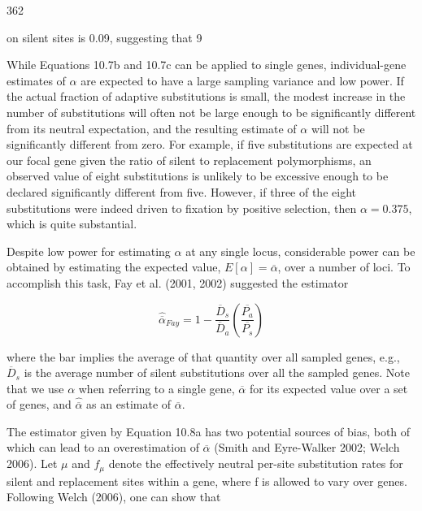 \documentclass{article}
\begin{document}
362

on silent sites is 0.09, suggesting that 9%

While Equations 10.7b and 10.7c can be applied to single genes, individual-gene estimates of  $ \alpha $ are expected to have a large sampling variance and low power. If the actual fraction of adaptive substitutions is small, the modest increase in the number of substitutions will often not be large enough to be significantly different from its neutral expectation, and the resulting estimate of  $ \alpha $ will not be significantly different from zero. For example, if five substitutions are expected at our focal gene given the ratio of silent to replacement polymorphisms, an observed value of eight substitutions is unlikely to be excessive enough to be declared significantly different from five. However, if three of the eight substitutions were indeed driven to fixation by positive selection, then  $ \alpha = 0.375 $, which is quite substantial.

Despite low power for estimating  $ \alpha $ at any single locus, considerable power can be obtained by estimating the expected value,  $ E[\alpha] = \overline{\alpha} $, over a number of loci. To accomplish this task, Fay et al. (2001, 2002) suggested the estimator

\begin{equation}
\widehat{\overline{\alpha}}_{F a y}=1-\frac{\overline{D}_{s}}{\overline{D}_{a}}\left(\frac{\overline{P_{a}}}{\overline{P_{s}}}\right)
\tag{10.8a}
\label{eq:10_8a}
\end{equation}

where the bar implies the average of that quantity over all sampled genes, e.g.,  $ \overline{D}_s $ is the average number of silent substitutions over all the sampled genes. Note that we use  $ \alpha $ when referring to a single gene,  $ \overline{\alpha} $ for its expected value over a set of genes, and  $ \widehat{\overline{\alpha}} $ as an estimate of  $ \overline{\alpha} $.

The estimator given by Equation 10.8a has two potential sources of bias, both of which can lead to an overestimation of  $ \overline{\alpha} $ (Smith and Eyre-Walker 2002; Welch 2006). Let  $ \mu $ and  $ f_{\mu} $ denote the effectively neutral per-site substitution rates for silent and replacement sites within a gene, where f is allowed to vary over genes. Following Welch (2006), one can show that
\end{document}
